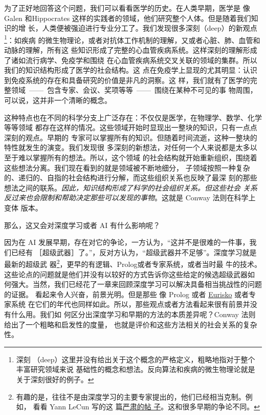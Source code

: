 为了正好地回答这个问题，我们可以看看医学的历史。在人类早期，医学是
像 Galen 和Hippocrates 这样的实践者的领域，他们研究整个人体。但是随着我们知识的增
长，人类便被强迫进行专业分工了。我们发现很多深刻（deep）的新观点\footnote{深刻
  （deep）这里并没有给出关于这个概念的严格定义，粗略地指对于整个丰富研究领域来说
  基础性的概念和想法。反向算法和疾病的微生物理论就是关于深刻很好的例子。}：如疾病
的微生物理论，或者对抗体工作机制的理解，又或者心脏、肺、血管和动脉的理解，所有这
些知识形成了完整的心血管疾病系统。这样深刻的理解形成了诸如流行病学、免疫学和围绕
在心血管疾病系统交叉关联的领域的集群。所以我们的知识结构形成了医学的社会结构。这
点在免疫学上显现的尤其明显：认识到免疫系统的存在和具备研究的价值是非凡的洞察。这
样，我们就有了医学的完整领域~——~包含专家、会议、奖项等等~——~围绕在某种不可见的事
物周围，可以说，这并非一个清晰的概念。

这种特点也在不同的科学分支上广泛存在：不仅仅是医学，在物理学、数学、化学等等领域
都存在这样的情况。这些领域开始时显现出一整块的知识，只有一点点深刻的观点。早期的
专家可以掌握所有的知识。但随着时间流逝，这种一整块的特性就发生的演变。我们发现很
多深刻的新想法，对任何一个人来说都是太多以至于难以掌握所有的想法。所以，这个领域
的社会结构就开始重新组织，围绕着这些想法分离。我们现在看到的就是领域被不断地细分，
子领域按照一种复杂的、递归的、自指的社会结构进行分解，而这些组织关系也反映了最深
刻的那些想法之间的联系。\emph{因此，知识结构形成了科学的社会组织关系。但这些社会
  关系反过来也会限制和帮助决定那些可以发现的事物}。这就是 Conway 法则在科学上变体
版本。

那么，这又会对深度学习或者 AI 有什么影响呢？

因为在 AI 发展早期，存在对它的争论，一方认为，“这并不是很难的一件事，我们已经有
［超级武器］了。”，反对方认为，“超级武器并不足够”。深度学习就是最新的超级武
器\footnote{有趣的是，往往不是由深度学习的主要专家提出的，他们已经相当克制。例如，
  看看 Yann LeCun 写的这
  篇\href{https://www.facebook.com/yann.lecun/posts/10152348155137143}{严肃的帖
    子}。这和很多早期的争论不同。}，更早的有逻辑、Prolog或者专家系统，或者当时最
牛的技术。这些论点的问题就是他们并没有以较好的方式告诉你这些给定的候选超级武器如
何强大。当然，我们已经花了一章来回顾深度学习可以解决具备相当挑战性的问题的证据。
看起来令人兴奋，前景光明。但是那些
像 Prolog 或者 \href{http://en.wikipedia.org/wiki/Eurisko}{Eurisko} 或者专家系统
在它们的年代也同样如此。所以，那些观点或者方法看起来很有前景并没有什么用。我们如
何区分出深度学习和早期的方法的本质差异呢？Conway 法则给出了一个粗略和启发性的度量，
也就是评价和这些方法相关的社会关系的复杂性。

